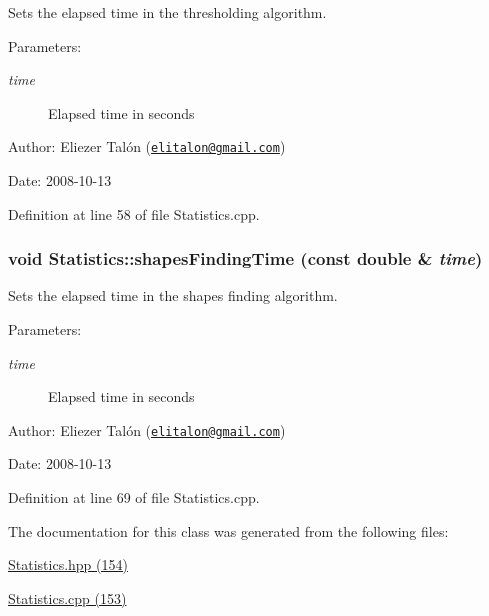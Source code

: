 Sets the elapsed time in the thresholding algorithm. 

\begin{Desc}
\item[Parameters:]
\begin{description}
\item[{\em time}]Elapsed time in seconds\end{description}
\end{Desc}
\begin{Desc}
\item[Author:]Eliezer Talón (\href{mailto:elitalon@gmail.com}{\tt elitalon@gmail.com}) \end{Desc}
\begin{Desc}
\item[Date:]2008-10-13 \end{Desc}


Definition at line 58 of file Statistics.cpp.\hypertarget{class_statistics_bc0a0e96adba6828ffb915a617b58ed2}{
\subsubsection[shapesFindingTime]{\setlength{\rightskip}{0pt plus 5cm}void Statistics::shapesFindingTime (const double \& {\em time})}}
\label{class_statistics_bc0a0e96adba6828ffb915a617b58ed2}


Sets the elapsed time in the shapes finding algorithm. 

\begin{Desc}
\item[Parameters:]
\begin{description}
\item[{\em time}]Elapsed time in seconds\end{description}
\end{Desc}
\begin{Desc}
\item[Author:]Eliezer Talón (\href{mailto:elitalon@gmail.com}{\tt elitalon@gmail.com}) \end{Desc}
\begin{Desc}
\item[Date:]2008-10-13 \end{Desc}


Definition at line 69 of file Statistics.cpp.

The documentation for this class was generated from the following files:\begin{CompactItemize}
\item 
\hyperlink{_statistics_8hpp}{Statistics.hpp (154)}\item 
\hyperlink{_statistics_8cpp}{Statistics.cpp (153)}\end{CompactItemize}
